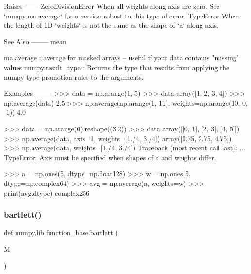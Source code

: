 \begin{DoxyVerb}
Raises
------
ZeroDivisionError
    When all weights along axis are zero. See `numpy.ma.average` for a
    version robust to this type of error.
TypeError
    When the length of 1D `weights` is not the same as the shape of `a`
    along axis.

See Also
--------
mean

ma.average : average for masked arrays -- useful if your data contains
             "missing" values
numpy.result_type : Returns the type that results from applying the
                    numpy type promotion rules to the arguments.

Examples
--------
>>> data = np.arange(1, 5)
>>> data
array([1, 2, 3, 4])
>>> np.average(data)
2.5
>>> np.average(np.arange(1, 11), weights=np.arange(10, 0, -1))
4.0

>>> data = np.arange(6).reshape((3,2))
>>> data
array([[0, 1],
       [2, 3],
       [4, 5]])
>>> np.average(data, axis=1, weights=[1./4, 3./4])
array([0.75, 2.75, 4.75])
>>> np.average(data, weights=[1./4, 3./4])
Traceback (most recent call last):
    ...
TypeError: Axis must be specified when shapes of a and weights differ.

>>> a = np.ones(5, dtype=np.float128)
>>> w = np.ones(5, dtype=np.complex64)
>>> avg = np.average(a, weights=w)
>>> print(avg.dtype)
complex256
\end{DoxyVerb}
 \mbox{\label{namespacenumpy_1_1lib_1_1function__base_a56b919ac5a2558c47bbedede77bfb474}} 
\subsubsection{\texorpdfstring{bartlett()}{bartlett()}}
{\footnotesize\ttfamily def numpy.\+lib.\+function\+\_\+base.\+bartlett (\begin{DoxyParamCaption}\item[{}]{M }\end{DoxyParamCaption})}


